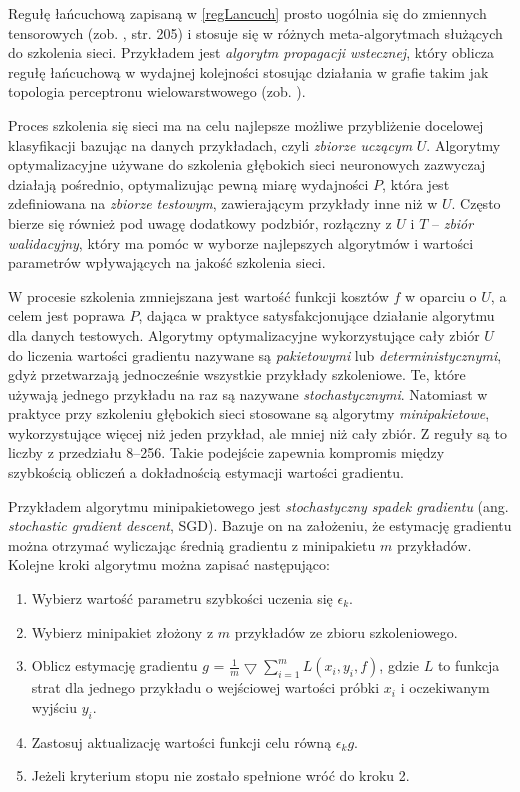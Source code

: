 Regułę łańcuchową zapisaną w \ref{regLancuch} prosto uogólnia się do zmiennych tensorowych (zob. \cite{Goodfellow-et-al-2016}, str. 205) i stosuje się w różnych meta-algorytmach służących do szkolenia sieci. Przykładem jest \textit{algorytm propagacji wstecznej}, który oblicza regułę łańcuchową w wydajnej kolejności stosując działania w grafie takim jak topologia perceptronu wielowarstwowego (zob. \cite{Goodfellow-et-al-2016}).

Proces szkolenia się sieci ma na celu najlepsze możliwe przybliżenie docelowej klasyfikacji bazując na danych przykładach, czyli \textit{zbiorze uczącym} $U$. Algorytmy optymalizacyjne używane do szkolenia głębokich sieci neuronowych zazwyczaj działają pośrednio, optymalizując pewną miarę wydajności $P$, która jest zdefiniowana na \textit{zbiorze testowym}, zawierającym przykłady inne niż w $U$. Często bierze się również pod uwagę dodatkowy podzbiór, rozłączny z $U$ i $T$ -- \textit{zbiór walidacyjny}, który ma pomóc w wyborze najlepszych algorytmów i wartości parametrów wpływających na jakość szkolenia sieci.

W procesie szkolenia zmniejszana jest wartość funkcji kosztów $f$ w oparciu o $U$, a celem jest poprawa $P$, dająca w praktyce satysfakcjonujące działanie algorytmu dla danych testowych. Algorytmy optymalizacyjne wykorzystujące cały zbiór $U$ do liczenia wartości gradientu nazywane są \textit{pakietowymi} lub \textit{deterministycznymi}, gdyż przetwarzają jednocześnie wszystkie przykłady szkoleniowe. Te, które używają jednego przykładu na raz są nazywane \textit{stochastycznymi}. Natomiast w praktyce przy szkoleniu głębokich sieci stosowane są algorytmy \textit{minipakietowe}, wykorzystujące więcej niż jeden przykład, ale mniej niż cały zbiór. Z reguły są to liczby z przedziału 8--256. Takie podejście zapewnia kompromis między szybkością obliczeń a dokładnością estymacji wartości gradientu.

Przykładem algorytmu minipakietowego jest \textit{stochastyczny spadek gradientu} (ang. \textit{stochastic gradient descent}, SGD). Bazuje on na założeniu, że estymację gradientu można otrzymać wyliczając średnią gradientu z minipakietu $m$ przykładów. Kolejne kroki algorytmu można zapisać następująco:
\begin{enumerate}
	\item Wybierz wartość parametru szybkości uczenia się $\epsilon_k$.
	\item Wybierz minipakiet złożony z $m$ przykładów ze zbioru szkoleniowego.
	\item Oblicz estymację gradientu $g$ = $\frac{1}{m}\bigtriangledown \sum_{i=1}^{m}L(x_i, y_i, f)$, gdzie $L$ to funkcja strat dla jednego przykładu o wejściowej wartości próbki $x_i$ i oczekiwanym wyjściu $y_i$.
	\item Zastosuj aktualizację wartości funkcji celu równą $\epsilon_k g$.
	\item Jeżeli kryterium stopu nie zostało spełnione wróć do kroku 2. 
\end{enumerate}


